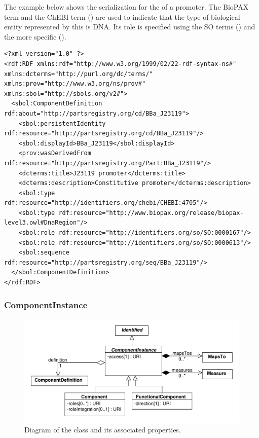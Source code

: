 The example below shows the serialization for the  of a promoter. The BioPAX term  and the ChEBI term  () are used to indicate that the type of biological entity represented by this  is DNA. Its role is specified using the SO terms  () and the more specific  ().

\begin{lstlisting}
<?xml version="1.0" ?>
<rdf:RDF xmlns:rdf="http://www.w3.org/1999/02/22-rdf-syntax-ns#" xmlns:dcterms="http://purl.org/dc/terms/" xmlns:prov="http://www.w3.org/ns/prov#" xmlns:sbol="http://sbols.org/v2#">
  <sbol:ComponentDefinition rdf:about="http://partsregistry.org/cd/BBa_J23119">
    <sbol:persistentIdentity rdf:resource="http://partsregistry.org/cd/BBa_J23119"/>
    <sbol:displayId>BBa_J23119</sbol:displayId>
    <prov:wasDerivedFrom rdf:resource="http://partsregistry.org/Part:BBa_J23119"/>
    <dcterms:title>J23119 promoter</dcterms:title>
    <dcterms:description>Constitutive promoter</dcterms:description>
    <sbol:type rdf:resource="http://identifiers.org/chebi/CHEBI:4705"/>
    <sbol:type rdf:resource="http://www.biopax.org/release/biopax-level3.owl#DnaRegion"/>
    <sbol:role rdf:resource="http://identifiers.org/so/SO:0000167"/>
    <sbol:role rdf:resource="http://identifiers.org/so/SO:0000613"/>
    <sbol:sequence rdf:resource="http://partsregistry.org/seq/BBa_J23119"/>
  </sbol:ComponentDefinition>
</rdf:RDF>
\end{lstlisting}


\subsubsection{ComponentInstance}
\label{sec:ComponentInstance}

\begin{figure}[ht]
\begin{center}
\includegraphics[scale=0.6]{uml/component_instance}
\caption[]{Diagram of the  class and its associated properties.}
\label{uml:component}
\end{center}
\end{figure}

